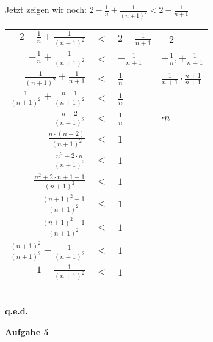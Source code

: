 \documentclass[a4paper]{scrartcl}
\begin{document}
\begin{flushleft}
		Jetzt zeigen wir noch: $2-\frac{1}{n}+\frac{1}{(n+1)^2} < 2 - \frac{1}{n+1}$\\
		\begin{center}
		\begin{tabular}{rcl | l}
		$2-\frac{1}{n}+\frac{1}{(n+1)^2}$ & $<$ & $2 - \frac{1}{n+1}$ & $-2$\\
		$-\frac{1}{n}+\frac{1}{(n+1)^2}$ & $<$ & $-\frac{1}{n+1}$ & $+\frac{1}{n}, +\frac{1}{n+1}$\\
		$\frac{1}{(n+1)^2}+\frac{1}{n+1}$ & $<$ & $\frac{1}{n}$ & $\frac{1}{n+1} \cdot \frac{n+1}{n+1}$\\
		$\frac{1}{(n+1)^2}+\frac{n+1}{(n+1)^2}$ & $<$ & $\frac{1}{n}$ & \\
		$\frac{n+2}{(n+1)^2}$ & $<$ & $\frac{1}{n}$ & $\cdot n$\\
		$\frac{n\cdot(n+2)}{(n+1)^2}$ & $<$ & $1$ & \\
		$\frac{n^2+2\cdot n}{(n+1)^2}$ & $<$ & $1$ & \\
		$\frac{n^2+2\cdot n+1-1}{(n+1)^2}$ & $<$ & $1$ & \\
		$\frac{(n+1)^2-1}{(n+1)^2}$ & $<$ & $1$ & \\
		$\frac{(n+1)^2-1}{(n+1)^2}$ & $<$ & $1$ & \\
		$\frac{(n+1)^2}{(n+1)^2}-\frac{1}{(n+1)^2}$ & $<$ & $1$ & \\
		$1-\frac{1}{(n+1)^2}$ & $<$ & $1$ & \\
		\end{tabular}\\[1em]
		\textbf{q.e.d.}\\
		\end{center}
	\end{flushleft}
	\begin{flushleft}
		\textbf{Aufgabe 5}\\
	\end{flushleft}
\end{document}
